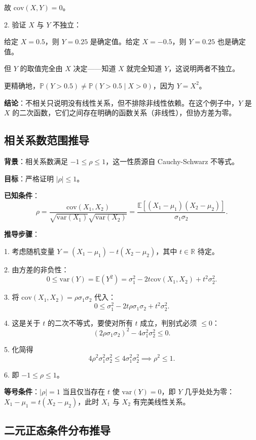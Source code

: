 故 $\text{cov}(X, Y) = 0$。

2. 验证 $X$ 与 $Y$ 不独立：

给定 $X = 0.5$，则 $Y = 0.25$ 是确定值。给定 $X = -0.5$，则 $Y = 0.25$ 也是确定值。

但 $Y$ 的取值完全由 $X$ 决定——知道 $X$ 就完全知道 $Y$，这说明两者不独立。

更精确地，$\mathbb{P}(Y > 0.5) \neq \mathbb{P}(Y > 0.5 \mid X > 0)$，因为 $Y = X^2$。

\textbf{结论}：不相关只说明没有线性关系，但不排除非线性依赖。在这个例子中，$Y$ 是 $X$ 的二次函数，它们之间存在明确的函数关系（非线性），但协方差为零。

\subsection{相关系数范围推导}\label{sec:derivation-ch2-correlation-bounds}

\textbf{背景}：相关系数满足 $-1 \leq \rho \leq 1$，这一性质源自 Cauchy-Schwarz 不等式。

\textbf{目标}：严格证明 $|\rho| \leq 1$。

\textbf{已知条件}：
\[
\rho = \frac{\text{cov}(X_1, X_2)}{\sqrt{\text{var}(X_1)} \sqrt{\text{var}(X_2)}} = \frac{\mathbb{E}[(X_1 - \mu_1)(X_2 - \mu_2)]}{\sigma_1 \sigma_2}.
\]

\textbf{推导步骤}：

1. 考虑随机变量 $Y = (X_1 - \mu_1) - t(X_2 - \mu_2)$，其中 $t \in \mathbb{R}$ 待定。

2. 由方差的非负性：
\[
0 \leq \text{var}(Y) = \mathbb{E}(Y^2) = \sigma_1^2 - 2t\text{cov}(X_1, X_2) + t^2 \sigma_2^2.
\]

3. 将 $\text{cov}(X_1, X_2) = \rho \sigma_1 \sigma_2$ 代入：
\[
0 \leq \sigma_1^2 - 2t\rho \sigma_1 \sigma_2 + t^2 \sigma_2^2.
\]

4. 这是关于 $t$ 的二次不等式，要使对所有 $t$ 成立，判别式必须 $\leq 0$：
\[
(2\rho \sigma_1 \sigma_2)^2 - 4 \sigma_1^2 \sigma_2^2 \leq 0.
\]

5. 化简得
\[
4\rho^2 \sigma_1^2 \sigma_2^2 \leq 4\sigma_1^2 \sigma_2^2 \implies \rho^2 \leq 1.
\]

6. 即 $-1 \leq \rho \leq 1$。

\textbf{等号条件}：$|\rho| = 1$ 当且仅当存在 $t$ 使 $\text{var}(Y) = 0$，即 $Y$ 几乎处处为零：$X_1 - \mu_1 = t(X_2 - \mu_2)$，此时 $X_1$ 与 $X_2$ 有完美线性关系。

\subsection{二元正态条件分布推导}\label{sec:derivation-ch2-bivariate-normal-conditional}

